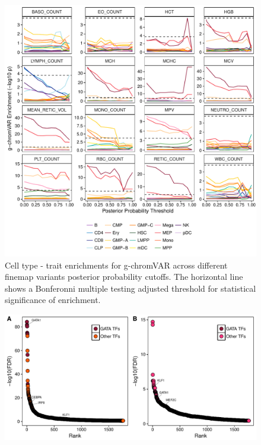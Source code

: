 \documentclass{article}\usepackage[]{graphicx}\usepackage[]{color}
\makeatletter
\def\maxwidth{ %
  \ifdim\Gin@nat@width>\linewidth
    \linewidth
  \else
    \Gin@nat@width
  \fi
}
\newenvironment{knitrout}{}{} %
\makeatother
\begin{document}
\begin{enumerate}[label=(\Alph*)]
\begin{knitrout}
\begin{figure}[H]
{\centering \includegraphics[width=\maxwidth]{figure/varyingPP-1} 

}

\caption[Cell type - trait enrichments for g-chromVAR across different finemap variants posterior probability cutoffs]{Cell type - trait enrichments for g-chromVAR across different finemap variants posterior probability cutoffs. The horizontal line shows a Bonferonni multiple testing adjusted threshold for statistical significance of enrichment.}\label{fig:varyingPP}
\end{figure}


\end{knitrout}

\begin{knitrout}
\color{fgcolor}\begin{figure}[H]

{\centering \includegraphics[width=\maxwidth]{figure/tfRankOrderPlots-1} 

}
\end{figure}
\end{knitrout}
\end{enumerate}
\end{document}
